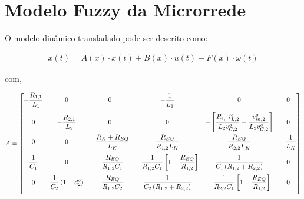 \section*{Modelo Fuzzy da Microrrede}

O modelo dinâmico transladado pode ser descrito como:

\begin{gather*}
    \dot{x}(t) = A(x) \cdot x(t) + B(x) \cdot u(t) + F(x) \cdot \omega(t)
\end{gather*}

com,

\begin{gather}
  A = \begin{bmatrix}
    \displaystyle - \frac{R_{1,1}}{L_1} & 0                         & 0                                         & \displaystyle - \frac{1}{L_1}                  & 0                                    & 0                           \\[12pt]
    0                         & \displaystyle - \frac{R_{2,1}}{L_2} & 0                                         & 0                                    & \displaystyle - \left[ \frac{R_{1,1} i_{L,2}^o}{L_2 v_{C,2}^o} - \frac{v_{in,2}^o}{L_2 v_{C,2}^o} \right]                  & 0                           \\[12pt]
    0                         & 0                         & - \displaystyle \frac{R_K + R_{EQ}}{L_K}   & \displaystyle \frac{R_{EQ}}{R_{1,2} L_K}              & \displaystyle \frac{R_{EQ}}{R_{2,2} L_K}              & - \displaystyle \frac{1}{L_K}         \\[12pt]
    \displaystyle \frac{1}{C_1}         & 0                         & \displaystyle - \frac{R_{EQ}}{R_{1,2} C_1}                 & \displaystyle - \frac{1}{R_{1,2}C_1} \left[ 1 - \frac{R_{EQ}}{R_{1,2}} \right] & \displaystyle \frac{1}{C_1 \left(R_{1,2} + R_{2,2}\right)}       & 0                           \\[12pt]
    0                         & \displaystyle \frac{1}{C_2} \left( 1 - d_2^o \right)         & \displaystyle - \frac{R_{EQ}}{R_{1,2} C_2} & \displaystyle \frac{1}{C_2 \left(R_{1,2} + R_{2,2}\right)}      & \displaystyle - \frac{1}{R_{2,2}C_1} \left[ 1 - \frac{R_{EQ}}{R_{1,2}} \right] & 0                           \\[12pt]

\end{bmatrix}
\end{gather}
